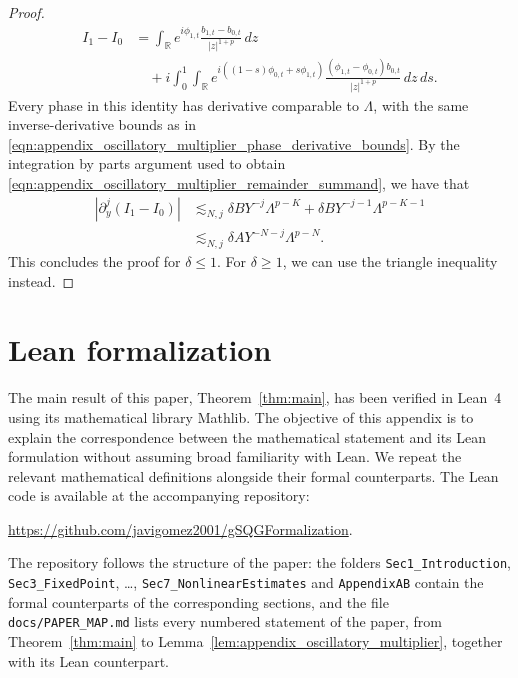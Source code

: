 \documentclass[11pt]{amsart}
\newcommand{\lean}{\lstinline[style=lean]}
\theoremstyle{definition}
\theoremstyle{remark}
\numberwithin{equation}{section}
\begin{document}
\begin{proof}
\begin{equation}
        \begin{aligned}
            I_1-I_0
            &=\int_{\mathbb R}e^{i\phi_{1,t}}
            \frac{b_{1,t}-b_{0,t}}{|z|^{1+p}}\,dz\\
            &\quad+i\int_0^1\int_{\mathbb R}
            e^{i((1-s)\phi_{0,t}+s\phi_{1,t})}
            \frac{(\phi_{1,t}-\phi_{0,t})b_{0,t}}{|z|^{1+p}}\,dz\,ds.
        \end{aligned}
    \end{equation}
    Every phase in this identity has derivative comparable to $\Lambda$, with the same inverse-derivative bounds as in \eqref{eqn:appendix_oscillatory_multiplier_phase_derivative_bounds}. By the integration by parts argument used to obtain \eqref{eqn:appendix_oscillatory_multiplier_remainder_summand}, we have that
    \begin{equation}\label{eqn:appendix_oscillatory_multiplier_difference_summand}
        \begin{aligned}
            |\partial_y^j(I_1-I_0)|
            &\lesssim_{N,j}\delta BY^{-j}\Lambda^{p-K}
            +\delta BY^{-j-1}\Lambda^{p-K-1}\\
            &\lesssim_{N,j}\delta AY^{-N-j}\Lambda^{p-N}.
        \end{aligned}
    \end{equation}
    This concludes the proof for $\delta \leq 1$. For $\delta \geq 1$, we can use the triangle inequality instead.
\end{proof}


\section{Lean formalization}\label{app:lean}

The main result of this paper, Theorem~\ref{thm:main}, has been verified in Lean~4 using its mathematical library Mathlib. The objective of this appendix is to explain the correspondence between the mathematical statement and its Lean formulation without assuming broad familiarity with Lean. We repeat the relevant mathematical definitions alongside their formal counterparts. The Lean code is available at the accompanying repository:
\begin{center}
  \url{https://github.com/javigomez2001/gSQGFormalization}.
\end{center}
The repository follows the structure of the paper: the folders \lean{Sec1_Introduction}, \lean{Sec3_FixedPoint}, \ldots, \lean{Sec7_NonlinearEstimates} and \lean{AppendixAB} contain the formal counterparts of the corresponding sections, and the file \texttt{docs/PAPER\_MAP.md} lists every numbered statement of the paper, from Theorem~\ref{thm:main} to Lemma~\ref{lem:appendix_oscillatory_multiplier}, together with its Lean counterpart.
\end{document}
